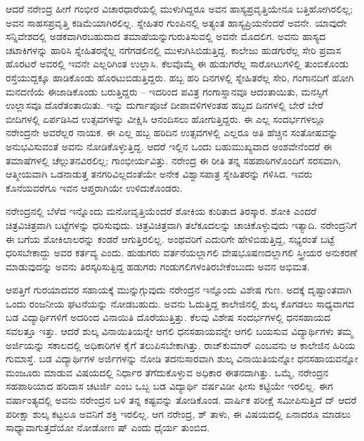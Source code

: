 ಆದರೆ ನರೇಂದ್ರ ಹೀಗೆ ಗಂಭೀರ ವಿಚಾರಧಾರೆಯಲ್ಲಿ ಮುಳುಗಿದ್ದರೂ ಅವನ ಹಾಸ್ಯಪ್ರವೃತ್ತಿಯೇನೂ ಬತ್ತಿಹೋಗಿರಲಿಲ್ಲ; ಅವನ ಸಾಹಸಪ್ರವೃತ್ತಿ ಕಡಿಮೆಯಾಗಿರಲಿಲ್ಲ. ಸ್ನೇಹಿತರ ಗುಂಪಿನಲ್ಲಿ ಅತ್ಯಂತ ಹಾಸ್ಯಪ್ರಿಯನೆಂದರೆ ಅವನೇ. ಯಾವುದೇ ಸನ್ನಿವೇಶದಲ್ಲಿ ಅಡಕವಾಗಿರಬಹುದಾದ ತಮಾಷೆಯನ್ನುಗುರುತಿಸುವಲ್ಲಿ ಅವನೇ ಮೊದಲಿಗ. ಅವನು ಹಾಸ್ಯದ ಚಟಾಕಿಗಳನ್ನು ಹಾರಿಸಿ ಸ್ನೇಹಿತರನ್ನೆಲ್ಲ ನಗೆಗಡಲಿನಲ್ಲಿ ಮುಳುಗಿಸಿಬಿಡುತ್ತಿದ್ದ. ಕಾಲೇಜು ಹುಡಗುರೆಲ್ಲ ಸೇರಿ ಪ್ರವಾಸ ಹೊರಟರೆ ಅವರಲ್ಲಿ ಇವನೇ ಎಲ್ಲರಿಗಿಂತ ಉಲ್ಲಾಸಿ. ಕೆಲವೊಮ್ಮೆ ಈ ಹುಡುಗರೆಲ್ಲ ಸಾರೋಟುಗಳಿಲ್ಲಿ ತುಂಬಿಕೊಂಡು ರಸ್ತೆಯುದ್ದಕ್ಕೂ ಹಾಡಿಕೊಂಡು ಹೊರಟುಬಿಡುತ್ತಿದ್ದರು. ಹಬ್ಬ ಹರಿ ದಿನಗಳಲ್ಲಿ ಸ್ನೇಹಿತರೆಲ್ಲ ಸೇರಿ, ಗಂಗಾನದಿಗೆ ಹೋಗಿ ಮನದಣಿಯೆ ಈಜಾಡಿಕೊಂಡು ಬರುತ್ತಿದ್ದರು – ಇದರಿಂದ ಪವಿತ್ರ ಗಂಗಾಸ್ನಾನವೂ ಆದಂತಾಯಿತು, ಮನಸ್ಸಿಗೆ ಉಲ್ಲಾಸವೂ ದೊರೆತಂತಾಯಿತು. ಇನ್ನು ದುರ್ಗಾಪೂಜೆ ದೀಪಾವಳಿಗಳಂತಹ ಹಬ್ಬದ ದಿನಗಳಲ್ಲಿ ಬೇರೆ ಬೇರೆ ಬೀದಿಗಳಲ್ಲಿ ಏರ್ಪಡಿಸಿದ ಉತ್ಸವಗಳನ್ನು ವೀಕ್ಷಿಸಿ ಆನಂದಿಸಲು ಹೋಗುತ್ತಿದ್ದರು. ಈ ಎಲ್ಲ ಸಂದರ್ಭಗಳಲ್ಲೂ ನರೇಂದ್ರನೇ ಅವರೆಲ್ಲರ ನಾಯಕ. ಈ ಎಲ್ಲ ಹಬ್ಬ ಹರಿದಿನ ಉತ್ಸವಗಳಲ್ಲಿ ಎಲ್ಲರೂ ಅತಿ ಹೆಚ್ಚಿನ ಸಂತೋಷವನ್ನು ಅನುಭವಿಸುವಂತೆ ಅವನು ನೋಡಿಕೊಳ್ಳುತ್ತಿದ್ದ. ಆದರೆ ಇಲ್ಲಿನ ಒಂದು ಬಹುಮುಖ್ಯವಾದ ಅಂಶವೇನೆಂದರೆ ಈ ತಮಾಷೆಗಳಲ್ಲಿ ಚೆಲ್ಲುತನವಿರಲಿಲ್ಲ; ಗಾಂಭೀರ್ಯವಿತ್ತು. ನರೇಂದ್ರ ಈ ರೀತಿ ತನ್ನ ಸಹಪಾಠಿಗಳೊಂದಿಗೆ ಸರಸವಾಗಿ, ಆತ್ಮೀಯವಾಗಿ ಒಡನಾಡುತ್ತ ತನಗರಿವಿಲ್ಲದಂತೆಯೇ ಅನೇಕ ವಿಶ್ವಾಸಪಾತ್ರ ಸ್ನೇಹಿತರನ್ನು ಗಳಿಸಿದ. ಇವರು ಕೊನೆಯವರೆಗೂ ಇವನ ಆಪ್ತರಾಗಿಯೇ ಉಳಿದುಕೊಂಡರು.

ನರೇಂದ್ರನಲ್ಲಿ ಬೆಳೆದ ಇನ್ನೊಂದು ಮನೋವೃತ್ತಿಯೆಂದರೆ ಶೋಕಿಯ ಕುರಿತಾದ ತಿರಸ್ಕಾರ. ಶೋಕಿ ಎಂದರೆ ಚಿತ್ರವಿಚಿತ್ರವಾಗಿ ಬಟ್ಟೆಗಳನ್ನು ಧರಿಸುವುದು. ಚಿತ್ರವಿಚಿತ್ರವಾಗಿ ತಲೆಕೂದಲನ್ನು ಚಾಚಿಕೊಳ್ಳುವುದು ಇತ್ಯಾದಿ. ನರೇಂದ್ರನಿಗೆ ಈ ಬಗೆಯ ಶೋಕಿಲಾಲರನ್ನು ಕಂಡರೆ ಆಗುತ್ತಿರಲಿಲ್ಲ. ಅಂಥವರಿಗೆ ಎದುರಿಗೇ ಹೇಳಿಬಿಡುತ್ತಿದ್ದ, ಸಭ್ಯರಂತೆ ಬಟ್ಟೆ ಧರಿಸಬೇಕಾದ್ದು ಅವರ ಕರ್ತವ್ಯ ಎಂದು. ಹುಡುಗರು ವರ್ತನೆಯಲ್ಲಾಗಲಿ ವೇಷಭೂಷಣದಲ್ಲಾಗಲಿ ಸ್ತ್ರೀಯರ ಅನುಕರಣೆ ಮಾಡುವುದನ್ನು ಅವನು ತಿರಸ್ಕರಿಸುತ್ದಿದ್ದ ಹಡುಗರು ಗಂಡುಗಲಿಗಳಂತಿರಬೇಕೆಂಬುದು ಅವನ ಅಭಿಮತ.

ಆಪತ್ತಿಗೆ ಗುರಯಾದವರ ಸಹಾಯಕ್ಕೆ ಮುನ್ನುಗ್ಗುವುದು ನರೇಂದ್ರನ ಇನ್ನೊಂದು ವಿಶೇಷ ಗುಣ. ಅದಕ್ಕೆ ದೃಷ್ಟಾಂತವಾಗಿ ಒಂದು ರಂಜನೀಯ ಘಟನೆಯನ್ನು ನೋಡಬಹುದು. ಅವನು ಓದುತ್ತಿದ್ದ ಕಾಲೇಜಿನಲ್ಲಿ ಶುಲ್ಕ ಕೊಗಡಲು ಸಾಧ್ಯವಾಗದ ಬಡ ವಿದ್ಯಾರ್ಥಿಗಳಿಗೆ ಅದರಿಂದ ವಿನಾಯಿತಿ ದೊರೆಯುತ್ತಿತ್ತು. ಕೆಲವು ವಿಶೇಷ ಸಂದರ್ಭಗಳಲ್ಲಿ ಧನಸಹಾಯದ ಸವಲತ್ತೂ ಇತ್ತು. ಆದರೆ ಶುಲ್ಕ ವಿನಾಯಿತಿಯನ್ನೇ ಆಗಲಿ ಧನಸಹಾಯವನ್ನೇ ಆಗಲಿ ಬಯಸುವ ವಿದ್ಯಾರ್ಥಿಗಳು ತಮ್ಮ ಅರ್ಜಿಯನ್ನು ಸಕಾಲದಲ್ಲಿ ಅಧಿಕಾರಿಗಳ ಕೈಗೆ ತಲುಪಿಸಬೇಕಾಗಿತ್ತು. ರಾಜ್​ಕುಮಾರ್ ಎಂಬವನು ಆ ಕಾಲೇಜಿನ ಹಿರಿಯ ಗುಮಾಸ್ತೆ. ಬಡ ವಿದ್ಯಾರ್ಥಿಗಳ ಅರ್ಜಿಗಳನ್ನು ನೋಡಿ ತದನುಸಾರವಾಗಿ ಶುಲ್ಕ ವಿನಾಯಿತಿಯನ್ನೋ ಧನಸಹಾಯವನ್ನೋ ಮಂಜೂರು ಮಾಡುವ ವಿಷಯದಲ್ಲಿ ನಿರ್ಧಾರ ತೆಗೆದುಕೊಳ್ಳುವ ಅಧಿಕಾರ ಈತನದಾಗಿತ್ತು. ಒಮ್ಮೆ, ನರೇಂದ್ರನ ಸಹಪಾಠಿಯಾದ ಹರಿದಾಸ ಚಟರ್ಜಿ ಎಂಬ ಒಬ್ಬ ಬಡ ವಿದ್ಯಾರ್ಥಿ ವರ್ಷವಿಡೀ ಫೀಸು ಕಟ್ಟಿಯೇ ಇರಲಿಲ್ಲ. ಈಗ ವರ್ಷಾಂತ್ಯದಲ್ಲಿ ಅವನು ನರೇಂದ್ರನ ಬಳಿ ತನ್ನ ಕಷ್ಟವನ್ನು ತೋಡಿಕೊಂಡ. ವಾರ್ಷಿಕ ಪರೀಕ್ಷೆ ಸಮೀಪಿಸುತ್ತಿದೆ ದ್ ಆದರೆ ಪರೀಕ್ಷಾ ಶುಲ್ಕ ಕಟ್ಟಲೂ ಅವನಿಗೆ ಶಕ್ತಿ ಇರಲಿಲ್ಲ. ಆಗ ನರೇಂದ್ರ, ಶ್ ತಾಳು, ಈ ವಿಷಯದಲ್ಲಿ ಏನಾದರೂ ಮಾಡಲು ಸಾಧ್ಯಾವಾಗುತ್ತದೆಯೋ ನೋಡೋಣ ಷ್ ಎಂದು ಧೈರ್ಯ ತುಂಬಿದ.

